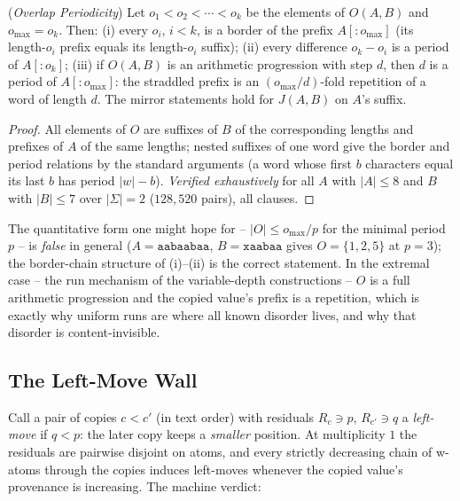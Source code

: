 \begin{lemma}
    (\emph{Overlap Periodicity})
    \label{lem:overlap}
    Let $o_1 < o_2 < \cdots < o_k$ be the elements of $O(A,B)$ and
    $o_{\max} = o_k$.  Then:
    (i) every $o_i$, $i < k$, is a border of the prefix $A[{:}o_{\max}]$
    (its length-$o_i$ prefix equals its length-$o_i$ suffix);
    (ii) every difference $o_k - o_i$ is a period of $A[{:}o_k]$;
    (iii) if $O(A,B)$ is an arithmetic progression with step $d$, then
    $d$ is a period of $A[{:}o_{\max}]$: the straddled prefix is an
    $(o_{\max}/d)$-fold repetition of a word of length $d$.  The mirror
    statements hold for $J(A,B)$ on $A$'s suffix.
\end{lemma}

\begin{proof}
    All elements of $O$ are suffixes of $B$ of the corresponding
    lengths and prefixes of $A$ of the same lengths; nested suffixes of
    one word give the border and period relations by the standard
    arguments (a word whose first $b$ characters equal its last $b$ has
    period $|w| - b$).  \emph{Verified exhaustively} for all $A$ with
    $|A| \leq 8$ and $B$ with $|B| \leq 7$ over $|\Sigma| = 2$
    ($128{,}520$ pairs), all clauses.
\end{proof}

\noindent The quantitative form one might hope for -- $|O| \leq
o_{\max}/p$ for the minimal period $p$ -- is \emph{false} in general
($A = \mathtt{aabaabaa}$, $B = \mathtt{xaabaa}$ gives $O = \{1,2,5\}$
at $p = 3$); the border-chain structure of (i)--(ii) is the correct
statement.  In the extremal case -- the run mechanism of the
variable-depth constructions -- $O$ is a full arithmetic progression
and the copied value's prefix is a repetition, which is exactly why
uniform runs are where all known disorder lives, and why that disorder
is content-invisible.

\subsection{The Left-Move Wall}

Call a pair of copies $c < c'$ (in text order) with residuals $R_c
\ni p$, $R_{c'} \ni q$ a \emph{left-move} if $q < p$: the later copy
keeps a \emph{smaller} position.  At multiplicity $1$ the residuals
are pairwise disjoint on atoms, and every strictly decreasing chain of
w-atoms through the copies induces left-moves whenever the copied
value's provenance is increasing.  The machine verdict:

